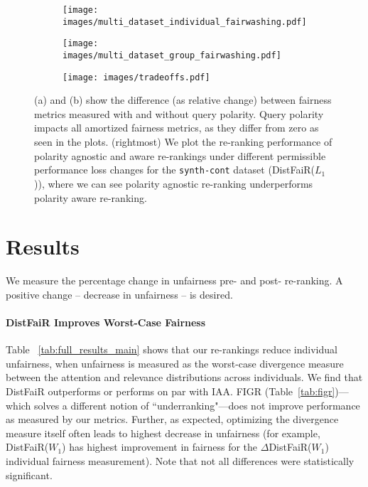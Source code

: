 \begin{figure*}[ht!]
\centering
\begin{subfigure}
    \centering
    \texttt{[image: images/multi\_dataset\_individual\_fairwashing.pdf]}
\end{subfigure}%
\begin{subfigure}
    \centering
    \texttt{[image: images/multi\_dataset\_group\_fairwashing.pdf]}
\end{subfigure}%
\begin{subfigure}
    \centering
    \texttt{[image: images/tradeoffs.pdf]}
\end{subfigure}
\caption{(a) and (b) show the difference (as relative change) between fairness metrics measured with and without query polarity. Query polarity impacts all amortized fairness metrics, as they differ from zero as seen in the plots. (rightmost) We plot the re-ranking performance of polarity agnostic and aware re-rankings under different permissible performance loss changes for the \texttt{synth-cont} dataset (DistFaiR($L_1$)), where we can see polarity agnostic re-ranking underperforms polarity aware re-ranking. %
}\label{fig:varying_theta}


\end{figure*}
\vspace{-0.5em}
\section{Results}

We measure the percentage change in unfairness pre- and post- re-ranking. A positive change -- decrease in unfairness -- is desired.

\paragraph{DistFaiR Improves Worst-Case  Fairness}
Table ~\ref{tab:full_results_main} shows that our re-rankings reduce individual unfairness, when unfairness is measured as the worst-case divergence measure between the attention and relevance distributions across individuals. We find that DistFaiR outperforms or performs on par with IAA. FIGR (Table~\ref{tab:figr})---which solves a different notion of ``underranking"---does not improve performance as measured by our metrics. Further, as expected, optimizing the divergence measure itself often leads to highest decrease in unfairness (for example, DistFaiR($W_1$) has highest improvement in fairness for the $\Delta$DistFaiR($W_1$) individual fairness measurement). Note that not all differences were statistically significant.

